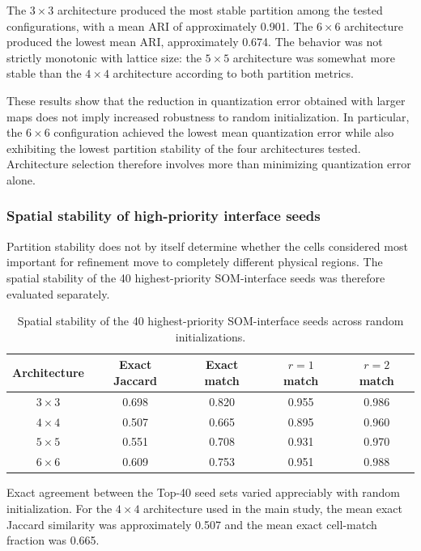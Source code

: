 The \(3\times3\) architecture produced the most stable partition among the
tested configurations, with a mean ARI of approximately 0.901. The
\(6\times6\) architecture produced the lowest mean ARI, approximately 0.674.
The behavior was not strictly monotonic with lattice size: the \(5\times5\)
architecture was somewhat more stable than the \(4\times4\) architecture
according to both partition metrics.

These results show that the reduction in quantization error obtained with
larger maps does not imply increased robustness to random initialization.
In particular, the \(6\times6\) configuration achieved the lowest mean
quantization error while also exhibiting the lowest partition stability of
the four architectures tested. Architecture selection therefore involves
more than minimizing quantization error alone.

\subsubsection{Spatial stability of high-priority interface seeds}

Partition stability does not by itself determine whether the cells considered
most important for refinement move to completely different physical regions.
The spatial stability of the 40 highest-priority SOM-interface seeds was
therefore evaluated separately.

\begin{table}[htbp]
\centering
\caption{Spatial stability of the 40 highest-priority SOM-interface seeds
across random initializations.}
\label{tab:som_spatial_stability}
\begin{tabular}{ccccc}
\hline
Architecture & Exact Jaccard & Exact match & \(r=1\) match & \(r=2\) match \\
\hline
\(3\times3\) & 0.698 & 0.820 & 0.955 & 0.986 \\
\(4\times4\) & 0.507 & 0.665 & 0.895 & 0.960 \\
\(5\times5\) & 0.551 & 0.708 & 0.931 & 0.970 \\
\(6\times6\) & 0.609 & 0.753 & 0.951 & 0.988 \\
\hline
\end{tabular}
\end{table}

Exact agreement between the Top-40 seed sets varied appreciably with random
initialization. For the \(4\times4\) architecture used in the main study,
the mean exact Jaccard similarity was approximately 0.507 and the mean exact
cell-match fraction was 0.665.

